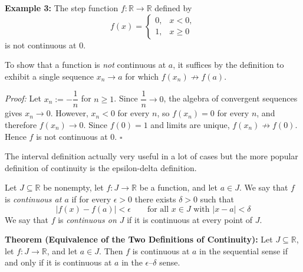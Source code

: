 \documentclass[a4paper,11pt,abstracton]{scrartcl}
\newcommand{\RR}{\mathbb{R}}
\theoremstyle{dotlessP}
\theoremstyle{dotlessS}
\theoremstyle{remark}
\theoremstyle{definition}
\begin{document}
\begin{example_box}
\textbf{Example 3:} The step function $f:\RR\to\RR$ defined by
\[
    f(x)=\begin{cases}0,&x<0,\\1,&x\ge0\end{cases}
\]
is not continuous at $0$.

To show that a function is \emph{not} continuous at $a$, it suffices by the definition to exhibit a single sequence $x_n\to a$ for which $f(x_n)\not\to f(a)$.

\textit{Proof:}
Let $x_n:=-\dfrac1n$ for $n\ge1$. Since $\dfrac1n\to0$, the algebra of convergent sequences gives $x_n\to0$. However, $x_n<0$ for every $n$, so $f(x_n)=0$ for every $n$, and therefore $f(x_n)\to0$. Since $f(0)=1$ and limits are unique, $f(x_n)\not\to f(0)$. Hence $f$ is not continuous at $0$.
\hfill$\square$
\end{example_box}

The interval definition actually very useful in a lot of cases but the more popular definition of continuity is the epsilon-delta definition.

\begin{definition_box}
Let $J\subseteq\RR$ be nonempty, let $f:J\rightarrow\RR$ be a function, and let $a\in J$. We say that $f$ is \emph{continuous at $a$} if for every $\epsilon>0$ there exists $\delta>0$ such that
\[
    |f(x)-f(a)|<\epsilon\qquad\text{for all }x\in J\text{ with }|x-a|<\delta
\]
We say that $f$ is \emph{continuous on $J$} if it is continuous at every point of $J$.
\end{definition_box}

\begin{problem_box}
\textbf{Theorem (Equivalence of the Two Definitions of Continuity):}
Let $J\subseteq\RR$, let $f:J\to\RR$, and let $a\in J$. Then $f$ is continuous at $a$ in the sequential sense if and only if it is continuous at $a$ in the $\epsilon$--$\delta$ sense.
\end{problem_box}
\end{document}
